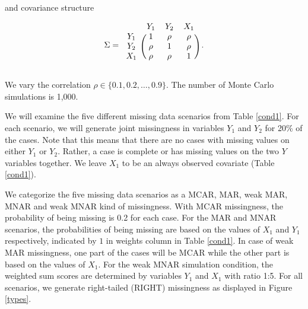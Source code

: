 \documentclass[11pt,a4paper]{article}
\begin{document}
\noindent and covariance structure  

\begin{equation*}
\Sigma = 
\begin{blockarray}{ccccc}
& Y_1 & Y_2 & X_1\\
\begin{block}{c(cccc)}
Y_1 & 1 & \rho & \rho \\
Y_2 & \rho & 1 & \rho \\
X_1 & \rho & \rho & 1 \\
\end{block}
\end{blockarray}\hspace{1mm}. 
\end{equation*}

\noindent We vary the correlation $\rho \in \{0.1, 0.2, \dots, 0.9\}$. The number of Monte Carlo simulations is 1,000.

We will examine the five different missing data scenarios from Table \ref{cond1}. For each scenario, we will generate joint missingness in variables $Y_1$ and $Y_2$ for 20\% of the cases. Note that this means that there are no cases with missing values on either $Y_1$ or $Y_2$. Rather, a case is complete or has missing values on the two $Y$ variables together. We leave $X_1$ to be an always observed covariate (Table \ref{cond1}). 

We categorize the five missing data scenarios as a MCAR, MAR, weak MAR, MNAR and weak MNAR kind of missingness. With MCAR missingness, the probability of being missing is 0.2 for each case. For the MAR and MNAR scenarios, the probabilities of being missing are based on the values of $X_1$ and $Y_1$ respectively, indicated by $1$ in weights column in Table \ref{cond1}. In case of weak MAR missingness, one part of the cases will be MCAR while the other part is based on the values of $X_1$. For the weak MNAR simulation condition, the weighted sum scores are determined by variables $Y_1$ and $X_1$ with ratio 1:5. For all scenarios, we generate right-tailed (RIGHT) missingness as displayed in Figure \ref{types}. 
\end{document}
